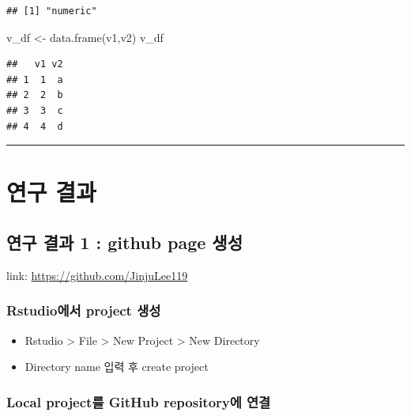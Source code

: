 \documentclass[
]{article}
\newenvironment{Shaded}{\begin{snugshade}}{\end{snugshade}}
\newcommand{\FunctionTok}[1]{\textcolor[rgb]{0.00,0.00,0.00}{#1}}
\newcommand{\NormalTok}[1]{#1}
\newcommand{\OtherTok}[1]{\textcolor[rgb]{0.56,0.35,0.01}{#1}}
\providecommand{\tightlist}{%
  \setlength{\itemsep}{0pt}\setlength{\parskip}{0pt}}
\begin{document}
\begin{verbatim}
## [1] "numeric"
\end{verbatim}

\begin{Shaded}
\begin{Highlighting}[]
\NormalTok{v\_df }\OtherTok{\textless{}{-}} \FunctionTok{data.frame}\NormalTok{(v1,v2)}
\NormalTok{v\_df}
\end{Highlighting}
\end{Shaded}

\begin{verbatim}
##   v1 v2
## 1  1  a
## 2  2  b
## 3  3  c
## 4  4  d
\end{verbatim}

\begin{center}\rule{0.5\linewidth}{0.5pt}\end{center}

\hypertarget{uxc5f0uxad6c-uxacb0uxacfc}{%
\section{연구 결과}\label{uxc5f0uxad6c-uxacb0uxacfc}}

\hypertarget{uxc5f0uxad6c-uxacb0uxacfc-1-github-page-uxc0dduxc131}{%
\subsection{연구 결과 1 : github page
생성}\label{uxc5f0uxad6c-uxacb0uxacfc-1-github-page-uxc0dduxc131}}

link: \url{https://github.com/JinjuLee119}

\hypertarget{rstudiouxc5d0uxc11c-project-uxc0dduxc131}{%
\subsubsection{Rstudio에서 project
생성}\label{rstudiouxc5d0uxc11c-project-uxc0dduxc131}}

\begin{itemize}
\tightlist
\item
  Rstudio \textgreater{} File \textgreater{} New Project \textgreater{}
  New Directory
\item
  Directory name 입력 후 create project
\end{itemize}

\hypertarget{local-projectuxb97c-github-repositoryuxc5d0-uxc5f0uxacb0}{%
\subsubsection{Local project를 GitHub repository에
연결}\label{local-projectuxb97c-github-repositoryuxc5d0-uxc5f0uxacb0}}
\end{document}
